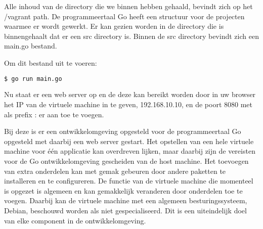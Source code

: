 Alle inhoud van de directory die we binnen hebben gehaald, bevindt zich op het /vagrant path. De programmeertaal Go heeft een structuur voor de projecten waarmee er wordt gewerkt. Er kan gezien worden in de directory die is binnengehaalt dat er een src directory is. Binnen de src directory bevindt zich een main.go bestand. 

\noindent Om dit bestand uit te voeren:
\begin{lstlisting}[language=bash]
  $ go run main.go
\end{lstlisting}

Nu staat er een web server op en de deze kan bereikt worden door in uw browser het IP van de virtuele machine in te geven, 192.168.10.10, en de poort 8080 met als prefix : er aan toe te voegen.

Bij deze is er een ontwikkelomgeving opgesteld voor de programmeertaal Go opgesteld met daarbij een web server gestart. Het opstellen van een hele virtuele machine voor één applicatie kan overdreven lijken, maar daarbij zijn de vereisten voor de Go ontwikkelomgeving gescheiden van de host machine. Het toevoegen van extra onderdelen kan met gemak gebeuren door andere paketten te installeren en te configureren. De functie van de virtuele machine die momenteel is opgezet is algemeen en kan gemakkelijk veranderen door onderdelen toe te voegen. Daarbij kan de virtuele machine met een algemeen besturingssysteem, Debian, beschouwd worden als niet gespecialiseerd. Dit is een uiteindelijk doel van elke component in de ontwikkelomgeving. 